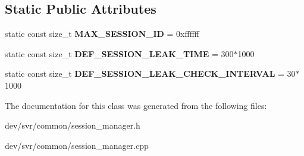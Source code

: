 \subsection*{Static Public Attributes}
\begin{DoxyCompactItemize}
\item 
\hypertarget{classSessionManager_aea350b6b987f04cb9364fb1e16c32513}{
static const size\_\-t {\bfseries MAX\_\-SESSION\_\-ID} = 0xffffff}
\label{classSessionManager_aea350b6b987f04cb9364fb1e16c32513}

\item 
\hypertarget{classSessionManager_a06c67189f6db26cddf7eb8f4b37e4c40}{
static const size\_\-t {\bfseries DEF\_\-SESSION\_\-LEAK\_\-TIME} = 300$\ast$1000}
\label{classSessionManager_a06c67189f6db26cddf7eb8f4b37e4c40}

\item 
\hypertarget{classSessionManager_a942bbca0c357a97bbaf5f07aea2c0f40}{
static const size\_\-t {\bfseries DEF\_\-SESSION\_\-LEAK\_\-CHECK\_\-INTERVAL} = 30$\ast$1000}
\label{classSessionManager_a942bbca0c357a97bbaf5f07aea2c0f40}

\end{DoxyCompactItemize}


The documentation for this class was generated from the following files:\begin{DoxyCompactItemize}
\item 
dev/svr/common/session\_\-manager.h\item 
dev/svr/common/session\_\-manager.cpp\end{DoxyCompactItemize}

